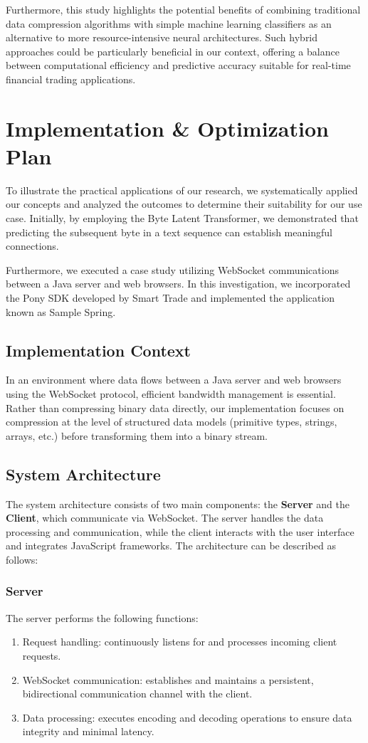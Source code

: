 \documentclass[a4paper, 11pt, twoside, openright]{report}
\begin{document}
Furthermore, this study highlights the potential benefits of combining traditional data compression algorithms with simple machine learning classifiers as an alternative to more resource-intensive neural architectures. Such hybrid approaches could be particularly beneficial in our context, offering a balance between computational efficiency and predictive accuracy suitable for real-time financial trading applications.


\chapter{Implementation \& Optimization Plan}
To illustrate the practical applications of our research, we systematically applied our concepts and analyzed the outcomes to determine their suitability for our use case. Initially, by employing the Byte Latent Transformer, we demonstrated that predicting the subsequent byte in a text sequence can establish meaningful connections.

Furthermore, we executed a case study utilizing WebSocket communications between a Java server and web browsers. In this investigation, we incorporated the Pony SDK developed by Smart Trade and implemented the application known as Sample Spring.

\section{Implementation Context}
In an environment where data flows between a Java server and web browsers using the WebSocket protocol, efficient bandwidth management is essential. Rather than compressing binary data directly, our implementation focuses on compression at the level of structured data models (primitive types, strings, arrays, etc.) before transforming them into a binary stream.

\section{System Architecture}

The system architecture consists of two main components: the \textbf{Server} and the \textbf{Client}, which communicate via WebSocket. The server handles the data processing and communication, while the client interacts with the user interface and integrates JavaScript frameworks. The architecture can be described as follows:

\subsection{Server}
The server performs the following functions:
\begin{enumerate}[label=\arabic*.]
    \item Request handling: continuously listens for and processes incoming client requests.
    \item WebSocket communication: establishes and maintains a persistent, bidirectional communication channel with the client.
    \item Data processing: executes encoding and decoding operations to ensure data integrity and minimal latency.
\end{enumerate}
\end{document}
